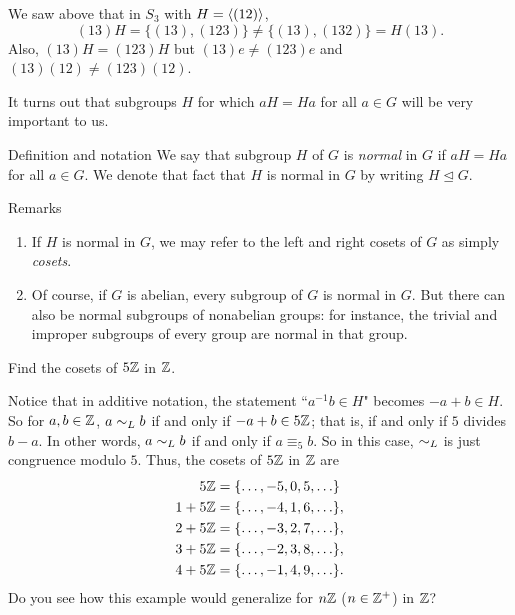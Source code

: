 \begin{example}{} We saw above that in $S_3$ with $H=\langle(12)\rangle$,
$$(13)H=\{(13),(123)\} \neq \{(13),(132)\}=H(13).$$  Also,
$(13)H=(123)H$ but $(13)e\neq (123)e$ and $(13)(12)\neq (123)(12)$.
\end{example}

 It turns out that subgroups $H$ for which $aH=Ha$ for all $a\in
G$ will be very important to us.

\begin{df}{Definition and notation} We say that subgroup $H$ of $G$ is \textit{normal} in $G$
if $aH=Ha$ for all $a\in G$. We denote that fact that $H$ is
normal in $G$ by writing $H\unlhd G$.\end{df}


\begin{df}{Remarks}\

 \begin{enumerate}

\item If $H$ is normal in $G$, we may refer to the left and
    right cosets of $G$ as simply \textit{cosets}.

\item Of course, if $G$ is abelian, every subgroup of $G$ is normal in $G$.
 But there can also be normal subgroups of nonabelian groups: for instance, the trivial and improper
 subgroups of every group are normal in that group.
\end{enumerate}

\end{df}

\begin{example}{} Find the cosets of $5\mathbb{Z}$ in $\mathbb{Z}$.

Notice that in additive notation, the statement ``$a^{-1}b\in H$"
 becomes $-a+b\in H$.  So for $a,b\in \mathbb{Z}$, $a\sim_L b$ if and only if $-a+b \in
 5\mathbb{Z}$; that is, if and only if $5$ divides $b-a$.  In other words, $a\sim_L b$ if and only if  $a\equiv_5 b$.  So
 in this case, $\sim_L$ is just congruence modulo $5$.  Thus, the cosets of $5\mathbb{Z}$ in $\mathbb{Z}$ are
\begin{align*}
5\mathbb{Z}&=\{\ldots,-5,0,5,\ldots\}\\
1+5\mathbb{Z}&=\{\ldots,-4, 1,
 6,\ldots\},\\
 2+5\mathbb{Z}&=\{\ldots,-3,2, 7,
 \ldots\},\\
 3+5\mathbb{Z}&=\{\ldots,-2,3, 8,
\ldots\},\\
 4+5\mathbb{Z}&=\{\ldots,-1, 4, 9,
\ldots\}.\end{align*}
Do you see how this example would
generalize for $n\mathbb{Z}$ ($n \in \mathbb{Z}^+$) in $\mathbb{Z}$?
\end{example}

